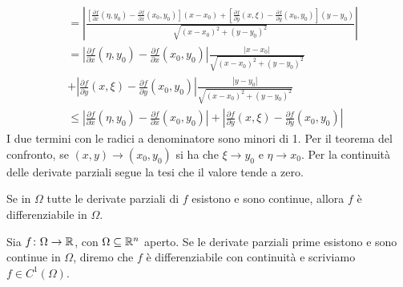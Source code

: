 \documentclass[a4paper]{article}
\begin{document}
\begin{radioactive}
\begin{snippetproof}{}
\begin{align*}
{{            }
        }
        \\ &= \left|
            \frac{
                \left[
                \frac{\partial f}{\partial x}(\eta, y_0) -
                \frac{\partial f}{\partial x}(x_0, y_0)
            \right](x-x_0)
            +
            \left[
                \frac{\partial f}{\partial y}(x, \xi) -
                \frac{\partial f}{\partial y}(x_0, y_0)
            \right](y-y_0)
            }{
                \sqrt{
                    {(x-x_0)}^2 + {(y-y_0)}^2
                }
            }
        \right| \\
        &= \left|
            \frac{\partial f}{\partial x}(\eta, y_0)
            - \frac{\partial f}{\partial x}(x_0, y_0)
        \right|
        \frac{|x-x_0|}{\sqrt{
            {(x-x_0)}^2 + {(y-y_0)}^2
        }}\\
        &+
        \left|
            \frac{\partial f}{\partial y}(x, \xi)
            - \frac{\partial f}{\partial y}(x_0, y_0)
        \right|
        \frac{|y-y_0|}{\sqrt{
            {(x-x_0)}^2 + {(y-y_0)}^2
        }} \\
        &\leq
        \left|\frac{\partial f}{\partial x}(\eta, y_0) - \frac{\partial f}{\partial x}(x_0, y_0)\right|
        +\left|\frac{\partial f}{\partial y}(x, \xi) - \frac{\partial f}{\partial y}(x_0, y_0)\right|
    \end{align*}
    I due termini con le radici a denominatore sono minori di 1.
    Per il teorema del confronto, se \((x,y) \to (x_0, y_0)\)
    si ha che \(\xi \to y_0\) e \(\eta \to x_0\).
    Per la continuità delle derivate parziali segue la tesi che il valore tende a zero.
\end{snippetproof}
\end{radioactive}

\begin{radioactive}
\begin{snippetcorollary}{}
    Se in \(\Omega\) tutte le derivate parziali
    di \(f\) esistono e sono continue,
    allora \(f\) è differenziabile in \(\Omega\).
\end{snippetcorollary}

\begin{snippetdefinition}{}
    Sia \(f \colon \Omega \to \mathbb{R}\), con \(\Omega \subseteq \mathbb{R}^n\) aperto.
    Se le derivate parziali prime esistono e sono continue in \(\Omega\), diremo che
    \(f\) è differenziabile con continuità e scriviamo \(f \in C^1(\Omega)\).
\end{snippetdefinition}
\end{radioactive}
\end{document}
